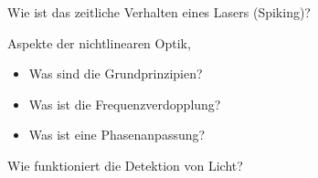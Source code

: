 \documentclass{subfiles}
\begin{document}
    \begin{Frage}
        Wie ist das zeitliche Verhalten eines Lasers (Spiking)?
    \end{Frage}
    \begin{Antwort}
        
    \end{Antwort}

    \begin{Frage}
        Aspekte der nichtlinearen Optik,
        \begin{itemize}[label=$\to$]
            \item Was sind die Grundprinzipien?
            \item Was ist die Frequenzverdopplung?
            \item Was ist eine Phasenanpassung?
        \end{itemize}
    \end{Frage}
    \begin{Antwort}
        
    \end{Antwort}

    \begin{Frage}
        Wie funktioniert die Detektion von Licht?
    \end{Frage}
    \begin{Antwort}
        
    \end{Antwort}
\end{document}
